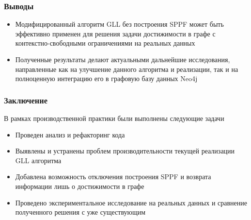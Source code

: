 \documentclass{beamer}
\begin{document}
\begin{frame}
\transwipe[direction=90]
 \frametitle{Выводы}
\begin{itemize}
    \item Модифицированный алгоритм GLL без построения SPPF может быть эффективно применен для решения задачи достижимости в графе с контекстно-свободными ограничениями на реальных данных
    \item Полученные результаты делают актуальными дальнейшие исследования, направленные как на улучшение данного алгоритма и реализации, так и на полноценную интеграцию его в графовую базу данных Neo4j
\end{itemize}
\end{frame}

\begin{frame}
\transwipe[direction=90]
 \frametitle{Заключение}
В рамках производственной практики были выполнены следующие задачи
\begin{itemize}
    \item Проведен анализ и рефакторинг кода
    \item Выявлены и устранены проблем производительности текущей реализации GLL алгоритма
    \item Добавлена возможность отключения построения SPPF и возврата информации лишь о достижимости в графе
    \item Проведено экспериментальное исследование на реальных данных и сравнение полученного решения с уже существующим
\end{itemize}
\end{frame}
\end{document}
